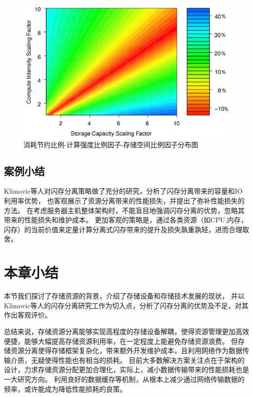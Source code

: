 \begin{figure}
\centering
\includegraphics[scale=0.7]{Figures/storage/compute_storage.jpg}
\decoRule
\caption{消耗节约比例-计算强度比例因子-存储空间比例因子分布图}
\label{fig:compute_storage}
\end{figure}

\subsection{案例小结}
Klimovic等人\cite{klimovic2016flash}对闪存分离策略做了充分的研究，分析了闪存分离带来的容量和IO利用率优势，
也客观展示了资源分离带来的性能损失，并提出了弥补性能损失的方法。
在考虑服务器主机整体架构时，不能盲目地强调闪存分离的优势，忽略其带来的性能损失和维护成本。
更加客观的策略是，通过各类资源（如CPU,内存，闪存）的当前价值来定量计算分离式闪存带来的提升及损失孰重孰轻，进而合理取舍。


\section{本章小结}
本节我们探讨了存储资源的背景，介绍了存储设备和存储技术发展的现状，
并以Klimovic等人\cite{klimovic2016flash}的闪存分离研究工作为切入点，分析了闪存分离的优势及不足，对其作出客观评价。

总结来说，存储资源分离能够实现高程度的存储设备解耦，使得资源管理更加高效便捷，能够大幅提高存储资源利用率，在一定程度上能避免存储资源浪费。
但存储资源分离使得存储框架复杂化，带来额外开发维护成本，且利用网络作为数据传输介质，无疑使得性能也有相当的损耗。
目前大多数解决方案关注点在于架构的设计，力求存储资源分配更加合理化，实际上，减小数据传输带来的性能损耗也是一大研究方向。
利用良好的数据缓存等机制，从根本上减少通过网络传输数据的频率，或许能成为降低性能损耗的良策。
